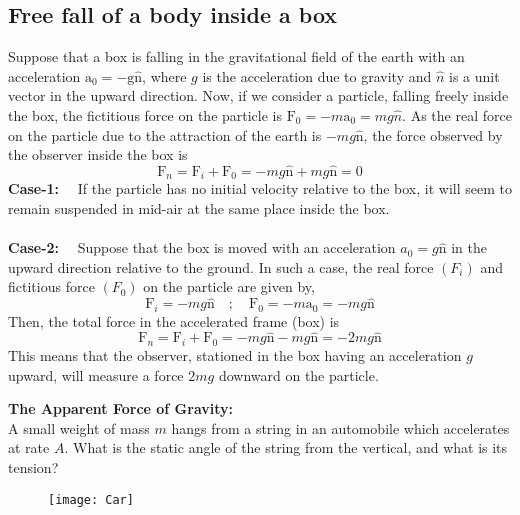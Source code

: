  \subsection{ Free fall of a body inside a box}
 Suppose that a box is falling in the gravitational field of the earth with an acceleration $\mathrm{a}_{0}=-\mathrm{g} \hat{\mathrm{n}}$, where $g$ is the acceleration due to gravity and $\hat{n}$ is a unit vector in the upward direction. Now, if we consider a particle, falling freely inside the box, the fictitious force on the particle is $\mathrm{F}_{0}=-m \mathrm{a}_{0}=m g \hat{n}$. As the real force on the particle due to the attraction of the earth is $-m g \hat{\mathrm{n}}$, the force observed by the observer inside the box is
 \begin{equation}
 \mathrm{F}_{n}=\mathrm{F}_{i}+\mathrm{F}_{0}=-m g \hat{\mathrm{n}}+m g \hat{\mathrm{n}}=0
 \end{equation}
\textbf{ Case-1:}$\quad$ If the particle has no initial velocity relative to the box, it will seem to remain suspended in mid-air at the same place inside the box.\\\\
\textbf{ Case-2:}$\quad$ Suppose that the box is moved with an acceleration $a_{0}=g \hat{\mathrm{n}}$ in the upward direction relative to the ground. In such a case, the real force $\left(F_{i}\right)$ and fictitious force $\left(F_{0}\right)$ on the particle are given by,
\begin{equation}
 \mathrm{F}_{i}=-m g \hat{\mathrm{n}}\quad ; \quad \mathrm{F}_{0}=-m {\mathrm{a}}_{0}=-m g \hat{\mathrm{n}}
\end{equation}
Then, the total force in the accelerated frame (box) is
\begin{equation}
 \mathrm{F}_{n}=\mathrm{F}_{i}+\mathrm{F}_{0}=-m g \hat{\mathrm{n}}-m g \hat{\mathrm{n}}=-2 m g \hat{\mathrm{n}}
\end{equation}
 This means that the observer, stationed in the box having an acceleration $g$ upward, will measure a force $2 m g$ downward on the particle.
\begin{exercise}
\textbf{The Apparent Force of Gravity:}\\
	A small weight of mass $m$ hangs from a string in an automobile which accelerates at rate $A .$ What is the static angle of the string from the vertical, and what is its tension?
\end{exercise}
\begin{figure}[H]
	\centering
	\texttt{[image: Car]}
\end{figure} 
